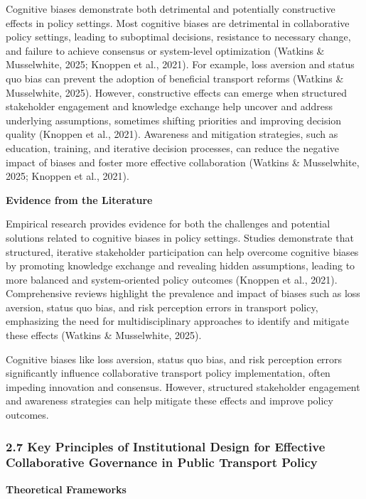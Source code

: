Cognitive biases demonstrate both detrimental and potentially constructive effects in policy settings. Most cognitive biases are detrimental in collaborative policy settings, leading to suboptimal decisions, resistance to necessary change, and failure to achieve consensus or system-level optimization (Watkins \& Musselwhite, 2025; Knoppen et al., 2021). For example, loss aversion and status quo bias can prevent the adoption of beneficial transport reforms (Watkins \& Musselwhite, 2025). However, constructive effects can emerge when structured stakeholder engagement and knowledge exchange help uncover and address underlying assumptions, sometimes shifting priorities and improving decision quality (Knoppen et al., 2021). Awareness and mitigation strategies, such as education, training, and iterative decision processes, can reduce the negative impact of biases and foster more effective collaboration (Watkins \& Musselwhite, 2025; Knoppen et al., 2021).

\textbf{Evidence from the Literature}

Empirical research provides evidence for both the challenges and potential solutions related to cognitive biases in policy settings. Studies demonstrate that structured, iterative stakeholder participation can help overcome cognitive biases by promoting knowledge exchange and revealing hidden assumptions, leading to more balanced and system-oriented policy outcomes (Knoppen et al., 2021). Comprehensive reviews highlight the prevalence and impact of biases such as loss aversion, status quo bias, and risk perception errors in transport policy, emphasizing the need for multidisciplinary approaches to identify and mitigate these effects (Watkins \& Musselwhite, 2025).

Cognitive biases like loss aversion, status quo bias, and risk perception errors significantly influence collaborative transport policy implementation, often impeding innovation and consensus. However, structured stakeholder engagement and awareness strategies can help mitigate these effects and improve policy outcomes.

\subsubsection{2.7 Key Principles of Institutional Design for Effective Collaborative Governance in Public Transport Policy}\label{key-principles-of-institutional-design-for-effective-collaborative-governance-in-public-transport-policy}

\textbf{Theoretical Frameworks}

